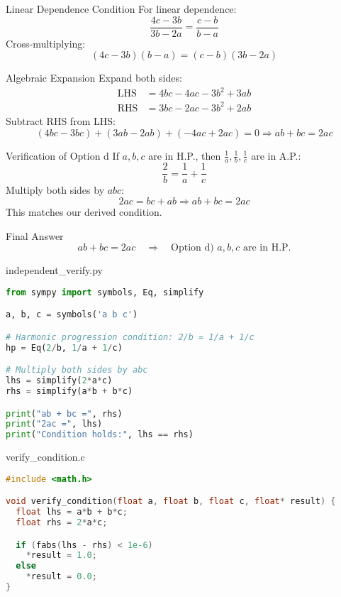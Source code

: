 \documentclass{beamer}
\begin{document}
\begin{frame}{Linear Dependence Condition}
For linear dependence:
\[
\frac{4c - 3b}{3b - 2a} = \frac{c - b}{b - a}
\]
Cross-multiplying:
\[
(4c - 3b)(b - a) = (c - b)(3b - 2a)
\]
\end{frame}

\begin{frame}{Algebraic Expansion}
Expand both sides:
\[
\begin{aligned}
\text{LHS} &= 4bc - 4ac - 3b^2 + 3ab \\
\text{RHS} &= 3bc - 2ac - 3b^2 + 2ab
\end{aligned}
\]
Subtract RHS from LHS:
\[
(4bc - 3bc) + (3ab - 2ab) + (-4ac + 2ac) = 0
\Rightarrow \boxed{ab + bc = 2ac}
\]
\end{frame}

\begin{frame}{Verification of Option d}
If \( a, b, c \) are in H.P., then \( \frac{1}{a}, \frac{1}{b}, \frac{1}{c} \) are in A.P.:
\[
\frac{2}{b} = \frac{1}{a} + \frac{1}{c}
\]
Multiply both sides by \( abc \):
\[
2ac = bc + ab
\Rightarrow \boxed{ab + bc = 2ac}
\]
This matches our derived condition.
\end{frame}

\begin{frame}{Final Answer}
\[
\boxed{ab + bc = 2ac}
\quad \Rightarrow \quad
\boxed{\text{Option d) } a, b, c \text{ are in H.P.}}
\]
\end{frame}

\begin{frame}[fragile]{independent\_verify.py}
\begin{lstlisting}[language=Python]
from sympy import symbols, Eq, simplify

a, b, c = symbols('a b c')

# Harmonic progression condition: 2/b = 1/a + 1/c
hp = Eq(2/b, 1/a + 1/c)

# Multiply both sides by abc
lhs = simplify(2*a*c)
rhs = simplify(a*b + b*c)

print("ab + bc =", rhs)
print("2ac =", lhs)
print("Condition holds:", lhs == rhs)
\end{lstlisting}
\end{frame}


\begin{frame}[fragile]{verify\_condition.c}
\begin{lstlisting}[language=C]
#include <math.h>

void verify_condition(float a, float b, float c, float* result) {
  float lhs = a*b + b*c;
  float rhs = 2*a*c;

  if (fabs(lhs - rhs) < 1e-6)
    *result = 1.0;
  else
    *result = 0.0;
}
\end{lstlisting}
\end{frame}
\end{document}
